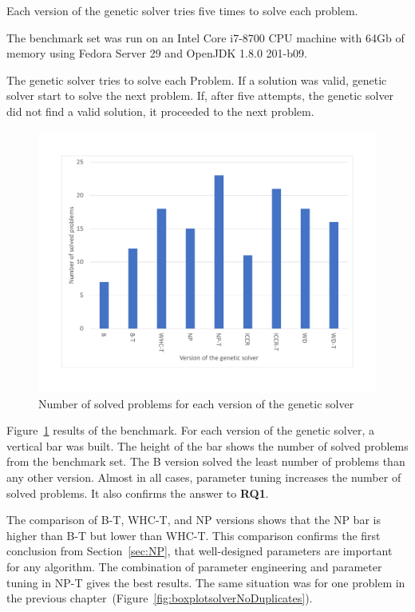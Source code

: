 Each version of the genetic solver tries five times to solve each problem.

The benchmark set was run on an Intel Core i7-8700 CPU machine with 64Gb of memory using Fedora Server 29 and OpenJDK 1.8.0 201-b09.

The genetic solver tries to solve each Problem. If a solution was valid, genetic solver start to solve the next problem. If, after five attempts, the genetic solver did not find a valid solution, it proceeded to the next problem.

\begin{figure}
	\centering
	\includegraphics[width=\textwidth]{images/EvaluationNumberOfSolvedProblems.pdf}
	\caption[Number of problems for each version of the genetic solver]{Number of solved problems for each version of the genetic solver}
	\label{fig:EvaluationNumberOfSolvedProblems}
\end{figure}

Figure~\ref{fig:EvaluationNumberOfSolvedProblems} results of the benchmark. For each version of the genetic solver, a vertical bar was built. The height of the bar shows the number of solved problems from the benchmark set. The B version solved the least number of problems than any other version. Almost in all cases, parameter tuning increases the number of solved problems. It also confirms the answer to \textbf{RQ1}. 

The comparison of B-T, WHC-T, and NP versions shows that the NP bar is higher than B-T but lower than WHC-T. This comparison confirms the first conclusion from Section~\ref{sec:NP}, that well-designed parameters are important for any algorithm. The combination of parameter engineering and parameter tuning in NP-T gives the best results. The same situation was for one problem in the previous chapter~(Figure~\ref{fig:boxplotsolverNoDuplicates}). 

